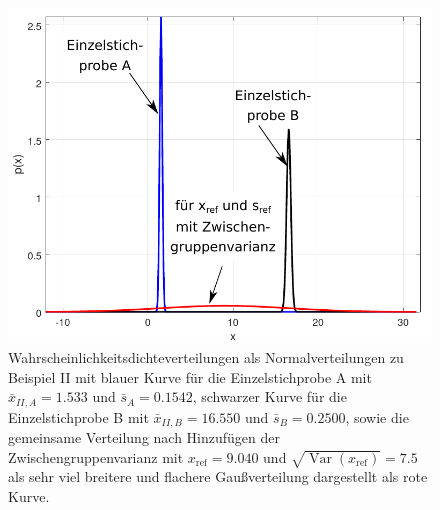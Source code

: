 \begin{figure}[!htp]
	\begin{center}
		\includegraphics[width=120mm]{06_vorlesung/media/PauleMandel.pdf}
		\caption{Wahrscheinlichkeitsdichteverteilungen als Normalverteilungen
  zu Beispiel II mit blauer Kurve für die Einzelstichprobe A mit $\bar x_{II,A} = 1.533$
  und $\bar s_A = 0.1542$, schwarzer Kurve für die Einzelstichprobe B mit $\bar x_{II,B} = 16.550$
  und $\bar s_B = 0.2500$, sowie die gemeinsame Verteilung nach Hinzufügen der Zwischengruppenvarianz mit
  $x_\mathrm{ref} = 9.040$ und $\sqrt{\operatorname{Var}(x_\mathrm{ref})} = 7.5$ als sehr viel breitere und
  flachere Gaußverteilung dargestellt als rote Kurve.}
		\label{fig:Pau82BeispielII}
	\end{center}
\end{figure}

